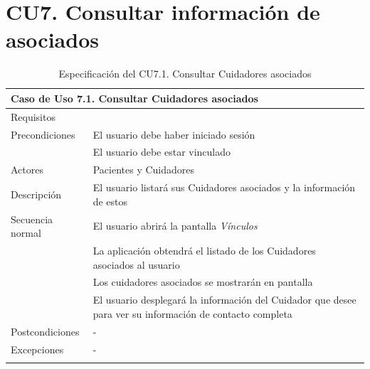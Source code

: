 \section{CU7. Consultar información de asociados}

\begin{longtable}{|p{} p{}|}
    \hline
    \multicolumn{2}{|l|}{\textbf{Caso de Uso 7.1. Consultar Cuidadores asociados}} \\ \hline \hline
    Requisitos          & {req:consultar_info_cuidador} \\ \hline
    Precondiciones      & El usuario debe haber iniciado sesión \\
                        & El usuario debe estar vinculado \\ \hline
    Actores             & Pacientes y Cuidadores \\ \hline
    Descripción         & El usuario listará sus Cuidadores asociados y la información de estos \\ \hline
    Secuencia normal    & El usuario abrirá la pantalla \emph{Vínculos} \\
                        & La aplicación obtendrá el listado de los Cuidadores asociados al usuario \\
                        & Los cuidadores asociados se mostrarán en pantalla \\
                        & El usuario desplegará la información del Cuidador que desee para ver su información de contacto completa \\ \hline
    Postcondiciones     & - \\ \hline
    Excepciones         & - \\ \hline
    \caption{Especificación del CU7.1. Consultar Cuidadores asociados}
    \label{cu:consultar_cuidador}
\end{longtable}

